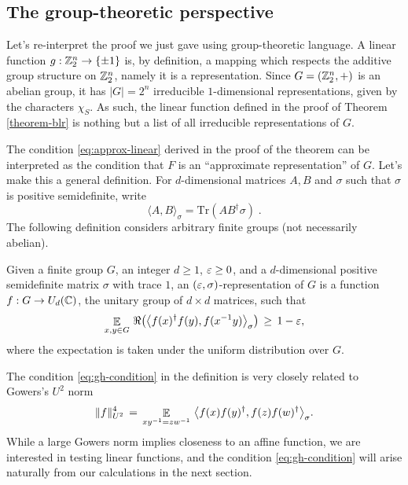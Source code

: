 \subsection{The group-theoretic perspective}
\label{section-paulibraiding-group}

Let's re-interpret the proof we just gave using group-theoretic language. A linear function $g: \mathbb{Z}_2^n\to\{\pm 1\}$ is, by definition, a mapping which respects the additive group structure on  $\mathbb{Z}_2^n$, namely it is a representation. Since $G=(\mathbb{Z}_2^n,+)$ is an abelian group, it has $|G|=2^n$ irreducible $1$-dimensional representations, given by the characters $\chi_S$. As such, the linear  function defined in the proof of Theorem \ref{theorem-blr} is nothing but a list of all irreducible representations of $G$. 

The condition \eqref{eq:approx-linear} derived in the proof of the theorem can be interpreted as the condition that $F$ is an ``approximate representation'' of $G$. Let's make this a general definition. For $d$-dimensional matrices  $A,B$ and $\sigma$ such that $\sigma$ is positive semidefinite, write 
$$\langle A,B\rangle_\sigma = \mathrm{Tr}(AB^\dagger \sigma)\;.$$
The following definition considers arbitrary finite groups (not necessarily abelian). 

\begin{definition}
Given a finite group $G$, an integer $d\geq 1$, $\varepsilon\geq 0$, and a $d$-dimensional positive semidefinite matrix $\sigma$ with trace $1$, an $(\varepsilon,\sigma)$-representation of $G$ is a function $f: G \to U_d(\mathbb{C})$, the unitary group of $d\times d$ matrices, such that 
\begin{equation}\label{eq:gh-condition}
\mathop{\mathbb{E}}\displaylimits_{x,y\in G} \,\Re\big(\big\langle f(x)^\dagger f(y) ,f(x^{-1}y) \big\rangle_\sigma\big) \,\geq\, 1-\varepsilon,
\end{equation} 
where the expectation is taken under the uniform distribution over $G$.
\end{definition}

\begin{remark}
The condition \eqref{eq:gh-condition} in the definition is very closely related to Gowers's $U^2$ norm
$$\|f\|_{U^2}^4 \,=\, \mathop{\mathbb{E}}\displaylimits_{xy^{-1}=zw^{-1}}\, \big\langle f(x)f(y)^\dagger ,f(z)f(w)^\dagger \big\rangle_\sigma.$$
While a large Gowers norm implies closeness to an affine function, we are interested in testing linear functions, and the condition \eqref{eq:gh-condition} will arise naturally from our calculations in the next section. 
\end{remark}

